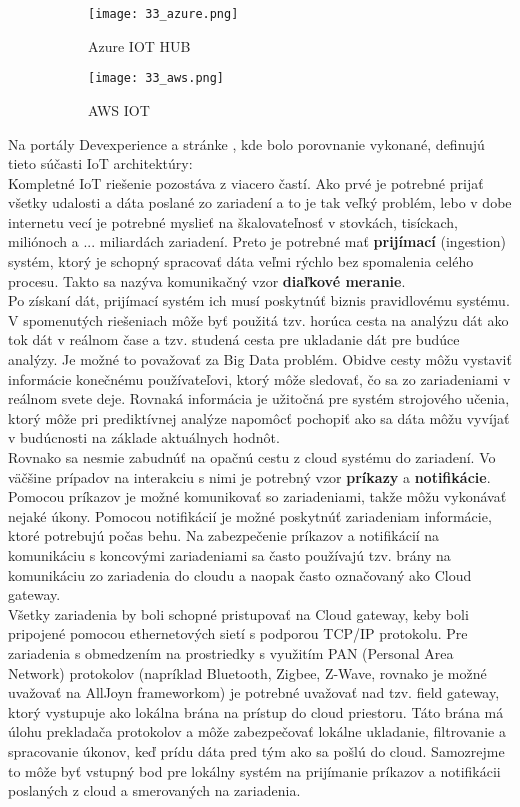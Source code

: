 \begin{figure}[!htbp]
\centering
\begin{subfigure}[b]{0.8\textwidth}
\texttt{[image: 33\_azure.png]}
\caption{Azure IOT HUB \cite{IOT22}}
\label{33_azure}
\end{subfigure}
\begin{subfigure}[b]{0.8\textwidth}
\texttt{[image: 33\_aws.png]}
\caption{AWS IOT \cite{IOT22}}
\label{33_aws}
\end{subfigure}
\caption{}
\label{33_aa}
\end{figure}
\indent Na portály Devexperience a stránke \cite{IOT22}, kde bolo porovnanie vykonané, definujú tieto súčasti IoT architektúry: \\
\indent Kompletné IoT riešenie pozostáva z viacero častí. Ako prvé je potrebné prijať všetky udalosti a dáta poslané zo zariadení a to je tak veľký problém, lebo v dobe internetu vecí je potrebné myslieť na škalovateľnosť v stovkách, tisíckach, miliónoch a ...  miliardách zariadení. Preto je potrebné mať \textbf{prijímací} (ingestion) systém, ktorý je schopný spracovať dáta veľmi rýchlo bez spomalenia celého procesu. Takto sa nazýva komunikačný vzor\textbf{ diaľkové meranie}. \\
\indent Po získaní dát, prijímací systém ich musí poskytnúť biznis pravidlovému systému. V spomenutých riešeniach môže byť použitá tzv. horúca cesta na analýzu dát ako tok dát v reálnom čase a tzv. studená cesta pre ukladanie dát pre budúce analýzy. Je možné to považovať za Big Data problém. Obidve cesty môžu vystaviť informácie konečnému používateľovi, ktorý môže sledovať, čo sa zo zariadeniami v reálnom svete deje. Rovnaká informácia je  užitočná pre systém strojového učenia, ktorý môže pri prediktívnej analýze napomôcť pochopiť ako sa dáta môžu vyvíjať v budúcnosti na základe aktuálnych hodnôt. \\
\indent Rovnako sa nesmie zabudnúť na opačnú cestu z cloud systému do zariadení. Vo väčšine prípadov na interakciu s nimi je potrebný vzor \textbf{príkazy} a \textbf{notifikácie}. Pomocou príkazov je možné komunikovať so zariadeniami, takže môžu vykonávať nejaké úkony. Pomocou notifikácií je možné poskytnúť zariadeniam informácie, ktoré potrebujú počas behu. Na zabezpečenie príkazov a notifikácií na komunikáciu s koncovými zariadeniami sa často používajú tzv. brány na komunikáciu zo zariadenia do cloudu a naopak často označovaný ako Cloud gateway. \\
\indent Všetky zariadenia by boli schopné pristupovať na Cloud gateway, keby boli pripojené pomocou ethernetových sietí s podporou TCP/IP protokolu. Pre zariadenia s obmedzením na prostriedky s využitím PAN (Personal Area Network) protokolov (napríklad Bluetooth, Zigbee, Z-Wave, rovnako je možné uvažovať na AllJoyn frameworkom) je potrebné uvažovať nad tzv. field gateway, ktorý vystupuje ako lokálna brána na prístup do cloud priestoru. Táto brána má úlohu prekladača protokolov a môže zabezpečovať lokálne ukladanie, filtrovanie a spracovanie úkonov, keď prídu dáta pred tým ako sa pošlú do cloud. Samozrejme to môže byť vstupný bod pre lokálny systém na prijímanie príkazov a notifikácii poslaných z cloud a smerovaných na zariadenia. \cite{IOT22}
